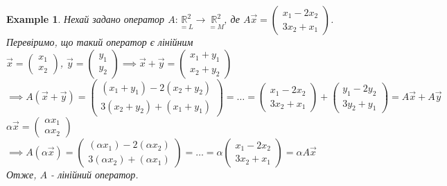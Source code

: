 \documentclass[a4paper, 10pt]{article}
\def\huge{\displaystyle}
\theoremstyle{theoremdd}
\theoremstyle{theoremdd}
\theoremstyle{theoremdd}
\theoremstyle{theoremdd}
\newtheorem{example}[theorem]{Example}
\theoremstyle{theoremdd}
\theoremstyle{theoremdd}
\theoremstyle{theoremdd}
\theoremstyle{theoremdd}
\begin{document}
	\begin{example}
	Нехай задано оператор $A: \underset{=L}{\mathbb{R}^2} \to \underset{=M}{\mathbb{R}^2}$, де \hspace{0.3cm} $\huge A\vec{x} = \begin{pmatrix} x_1 - 2x_2 \\ 3x_2 + x_1 \end{pmatrix}$.\\
	Перевіримо, що такий оператор є лінійним\\
	$\huge \vec{x} = \begin{pmatrix} x_1 \\ x_2 \end{pmatrix}$, $\huge \vec{y} = \begin{pmatrix} y_1 \\ y_2 \end{pmatrix} \implies \vec{x} + \vec{y} = \begin{pmatrix}
	x_1 + y_1 \\ x_2 + y_2
	\end{pmatrix}$\\
	$\implies A(\vec{x} + \vec{y}) = \begin{pmatrix} (x_1+y_1)-2(x_2+y_2) \\ 3(x_2+y_2)+(x_1+y_1) \end{pmatrix} = \dots = \begin{pmatrix} x_1 - 2x_2 \\ 3x_2 + x_1 \end{pmatrix} + \begin{pmatrix} y_1 - 2y_2 \\ 3y_2 + y_1 \end{pmatrix} = A\vec{x} + A\vec{y}$\\
	$\alpha \vec{x} = \begin{pmatrix} \alpha x_1 \\ \alpha x_2 \end{pmatrix}$\\
	$\implies A(\alpha \vec{x}) = \begin{pmatrix} (\alpha x_1) - 2(\alpha x_2) \\ 3(\alpha x_2) + (\alpha x_1) \end{pmatrix} = \dots = \alpha \begin{pmatrix} x_1 - 2x_2 \\ 3x_2 + x_1 \end{pmatrix} = \alpha A\vec{x}$\\
	Отже, $A$ - лінійний оператор.
	\end{example}
	
\end{document}
